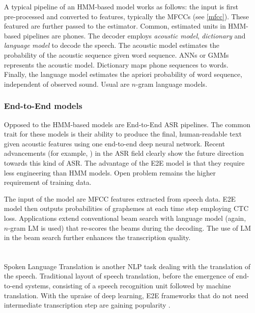 A typical pipeline of an HMM-based model works as follows: the input is first pre-processed and converted to features, typically the MFCCs (see \cref{mfcc}). These featured are further passed to the estimator. Common, estimated units in HMM-based pipelines are phones. The decoder employs \emph{acoustic model}, \emph{dictionary} and \emph{language model} to decode the speech. The acoustic model estimates the probability of the acoustic sequence given word sequence. ANNs or GMMs represents the acoustic model. Dictionary maps phone sequences to words. Finally, the language model estimates the apriori probability of word sequence, independent of observed sound. Usual are $n$-gram language models. 

\subsubsection{End-to-End models}
Opposed to the HMM-based models are End-to-End ASR pipelines. The common trait for these models is their ability to produce the final, human-readable text given acoustic features using one end-to-end deep neural network. Recent advancements (for example, ) in the ASR field clearly show the future direction towards this kind of ASR. The advantage of the E2E model is that they require less engineering than HMM models. Open problem remains the higher requirement of training data.

The input of the model are MFCC features extracted from speech data. E2E model then outputs probabilities of graphemes at each time step employing CTC loss. Applications extend conventional beam search with language model (again, $n$-gram LM is used) that re-scores the beams during the decoding. The use of LM in the beam search further enhances the transcription quality.

\section{}
Spoken Language Translation is another NLP task dealing with the translation of the speech.  Traditional layout of speech translation, before the emergence of end-to-end systems, consisting of a speech recognition unit followed by machine translation. With the upraise of deep learning, E2E frameworks that do not need intermediate transcription step are gaining popularity .

